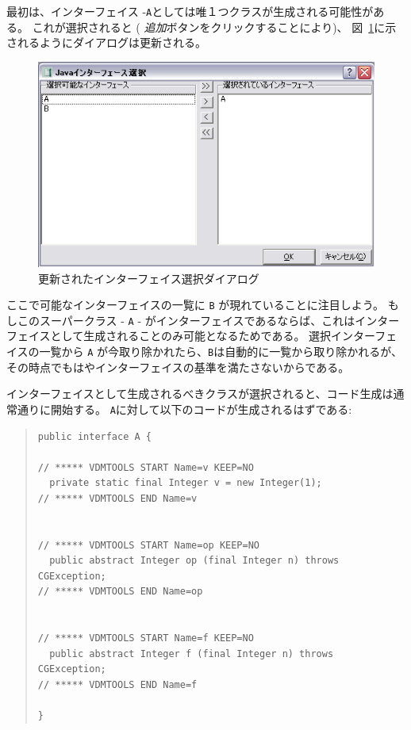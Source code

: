\documentclass[\pformat,11pt]{jarticle}
\begin{document}
最初は、インターフェイス -\texttt{A}としては唯１つクラスが生成される可能性がある。
これが選択されると ( \textit{追加}ボタンをクリックすることにより)、 図~\ref{fig:interfaces2}に示されるようにダイアログは更新される。

\begin{figure}
\begin{center}
\includegraphics[width=.8\textwidth]{interfaces2}
\end{center}
\caption{更新されたインターフェイス選択ダイアログ}\label{fig:interfaces2}
\end{figure}

ここで可能なインターフェイスの一覧に \texttt{B} が現れていることに注目しよう。
もしこのスーパークラス - \texttt{A} - がインターフェイスであるならば、これはインターフェイスとして生成されることのみ可能となるためである。
選択インターフェイスの一覧から \texttt{A} が今取り除かれたら、\texttt{B}は自動的に一覧から取り除かれるが、その時点でもはやインターフェイスの基準を満たさないからである。

インターフェイスとして生成されるべきクラスが選択されると、コード生成は通常通りに開始する。
\texttt{A}に対して以下のコードが生成されるはずである:
\begin{quote}
\begin{verbatim}
public interface A {

// ***** VDMTOOLS START Name=v KEEP=NO
  private static final Integer v = new Integer(1);
// ***** VDMTOOLS END Name=v


// ***** VDMTOOLS START Name=op KEEP=NO
  public abstract Integer op (final Integer n) throws CGException;
// ***** VDMTOOLS END Name=op


// ***** VDMTOOLS START Name=f KEEP=NO
  public abstract Integer f (final Integer n) throws CGException;
// ***** VDMTOOLS END Name=f

}
\end{verbatim}
\end{quote}
\end{document}
